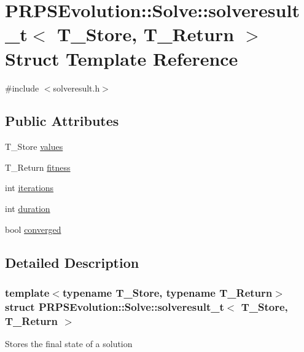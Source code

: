 \hypertarget{struct_p_r_p_s_evolution_1_1_solve_1_1solveresult__t}{\section{P\-R\-P\-S\-Evolution\-:\-:Solve\-:\-:solveresult\-\_\-t$<$ T\-\_\-\-Store, T\-\_\-\-Return $>$ Struct Template Reference}
\label{struct_p_r_p_s_evolution_1_1_solve_1_1solveresult__t}
}


{\ttfamily \#include $<$solveresult.\-h$>$}

\subsection*{Public Attributes}
\begin{DoxyCompactItemize}
\item 
T\-\_\-\-Store \hyperlink{struct_p_r_p_s_evolution_1_1_solve_1_1solveresult__t_a058c43621839d9bc61b96e69f8d5c778}{values}
\item 
T\-\_\-\-Return \hyperlink{struct_p_r_p_s_evolution_1_1_solve_1_1solveresult__t_a004724c255fb599621d2085d53f3669a}{fitness}
\item 
int \hyperlink{struct_p_r_p_s_evolution_1_1_solve_1_1solveresult__t_ae8b371ad4166477d279f6a8936757bf9}{iterations}
\item 
int \hyperlink{struct_p_r_p_s_evolution_1_1_solve_1_1solveresult__t_a1dccd3f663f1deac187652edab66000a}{duration}
\item 
bool \hyperlink{struct_p_r_p_s_evolution_1_1_solve_1_1solveresult__t_abf29e453e9bbc93551899cfa3c4a1578}{converged}
\end{DoxyCompactItemize}


\subsection{Detailed Description}
\subsubsection*{template$<$typename T\-\_\-\-Store, typename T\-\_\-\-Return$>$struct P\-R\-P\-S\-Evolution\-::\-Solve\-::solveresult\-\_\-t$<$ T\-\_\-\-Store, T\-\_\-\-Return $>$}

Stores the final state of a solution 

